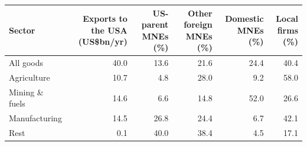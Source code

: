 \begin{tabular}{lrrrrr}
\toprule
Sector & Exports to the USA (US\$bn/yr) & US-parent MNEs (\%) & Other foreign MNEs (\%) & Domestic MNEs (\%) & Local firms (\%) \\
\midrule
\midrule
All goods & 40.0 & 13.6 & 21.6 & 24.4 & 40.4 \\
Agriculture & 10.7 & 4.8 & 28.0 & 9.2 & 58.0 \\
Mining \& fuels & 14.6 & 6.6 & 14.8 & 52.0 & 26.6 \\
Manufacturing & 14.5 & 26.8 & 24.4 & 6.7 & 42.1 \\
Rest & 0.1 & 40.0 & 38.4 & 4.5 & 17.1 \\
\bottomrule
\end{tabular}

